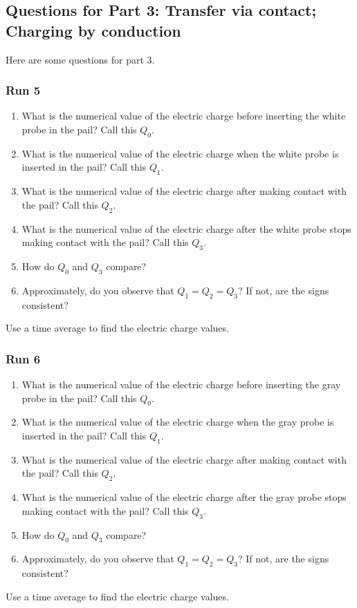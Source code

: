 \subsection{Questions for Part 3: Transfer via contact; Charging by conduction}
%
Here are some questions for part 3.
%
\subsubsection{Run 5}
%
\begin{enumerate}
	\item What is the numerical value of the electric charge before inserting the white probe in the pail? Call this $Q_{0}$.
	\item What is the numerical value of the electric charge when the white probe is inserted in the pail? Call this $Q_{1}$.
	\item What is the numerical value of the electric charge after making contact with the pail? Call this $Q_{2}$.
	\item What is the numerical value of the electric charge after the white probe stops making contact with the pail? Call this $Q_{3}$.
	\item How do $Q_{0}$ and $Q_{3}$ compare?
	\item Approximately, do you observe that $Q_{1} = Q_{2} = Q_{3}$? If not, are the signs consistent?
\end{enumerate}
Use a time average to find the electric charge values.
%
\subsubsection{Run 6}
%
\begin{enumerate}
	\item What is the numerical value of the electric charge before inserting the gray probe in the pail? Call this $Q_{0}$.
	\item What is the numerical value of the electric charge when the gray probe is inserted in the pail? Call this $Q_{1}$.
	\item What is the numerical value of the electric charge after making contact with the pail? Call this $Q_{2}$.
	\item What is the numerical value of the electric charge after the gray probe stops making contact with the pail? Call this $Q_{3}$.
	\item How do $Q_{0}$ and $Q_{3}$ compare?
	\item Approximately, do you observe that $Q_{1} = Q_{2} = Q_{3}$? If not, are the signs consistent?
\end{enumerate}
Use a time average to find the electric charge values.
%
